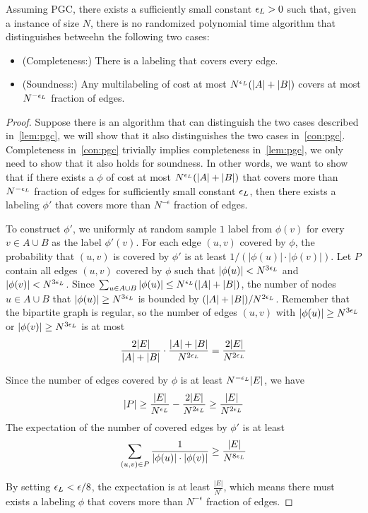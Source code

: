 \begin{lemma}\label{lem:pgc}
	Assuming PGC, 
	there exists a sufficiently small constant $\epsilon_{L}{} >0$ such that, given a \labcov{} instance of size $N$, there is no randomized polynomial time algorithm that distinguishes betweehn the following two cases: 
	\begin{itemize}
		\item (Completeness:) There is a labeling that covers every edge. 
		
		\item (Soundness:) Any multilabeling of cost at most $N^{\epsilon_{L}{}}(|A|+|B|)$ covers at most $N^{-\epsilon_{L}{}}$ fraction of edges. 
	\end{itemize}
\end{lemma}
\begin{proof}
    Suppose there is an algorithm that can distinguish the two cases described in~\cref{lem:pgc}, we will show that it also distinguishes the two cases in~\cref{con:pgc}. Completeness in~\cref{con:pgc} trivially implies completeness in~\cref{lem:pgc}, we only need to show that it also holds for soundness. In other words, we want to show that if there exists a \mlab{} $\phi$ of cost at most $N^{\epsilon_{L}}(|A|+|B|)$ that covers more than $N^{-\epsilon_{L}}$ fraction of edges for sufficiently small constant $\epsilon_{L}$, then there exists a labeling $\phi'$ that covers more than $N^{-\epsilon}$ fraction of edges.

    To construct $\phi'$, we uniformly at random sample $1$ label from $\phi(v)$ for every $v\in A\cup B$ as the label $\phi'(v)$. For each edge $(u,v)$ covered by $\phi$, the probability that $(u,v)$ is covered by $\phi'$ is at least $1/(|\phi(u)|\cdot |\phi(v)|)$. Let $P$ contain all edges $(u,v)$ covered by $\phi$ such that $|\phi(u)|<N^{3\epsilon_{L}}$ and $|\phi(v)|<N^{3\epsilon_{L}}$. Since $\sum_{u\in A\cup B}|\phi(u)|\le N^{\epsilon_{L}}(|A|+|B|)$, the number of nodes $u\in A\cup B$ that $|\phi(u)|\ge N^{3\epsilon_{L}}$ is bounded by $(|A|+|B|)/N^{2\epsilon_{L}}$. Remember that the bipartite graph is regular, so the number of edges $(u,v)$ with $|\phi(u)|\ge N^{3\epsilon_{L}}$ or $|\phi(v)|\ge N^{3\epsilon_{L}}$ is at most 
    \[\frac{2|E|}{|A|+|B|}\cdot \frac{|A|+|B|}{N^{2\epsilon_{L}}}=\frac{2|E|}{N^{2\epsilon_{L}}}\]

    Since the number of edges covered by $\phi$ is at least $N^{-\epsilon_{L}}|E|$, we have
    \[|P|\ge \frac{|E|}{N^{\epsilon_{L}}}-\frac{2|E|}{N^{2\epsilon_{L}}}\ge \frac{|E|}{N^{2\epsilon_{L}}}\]
    The expectation of the number of covered edges by $\phi'$ is at least
    \[\sum_{(u,v)\in P}\frac{1}{|\phi(u)|\cdot |\phi(v)|}\ge \frac{|E|}{N^{8\epsilon_{L}}}\]

    By setting $\epsilon_{L}<\epsilon/8$, the expectation is at least $\frac{|E|}{N^{\epsilon}}$, which means there must exists a labeling $\phi$ that covers more than $N^{-\epsilon}$ fraction of edges.
\end{proof}

